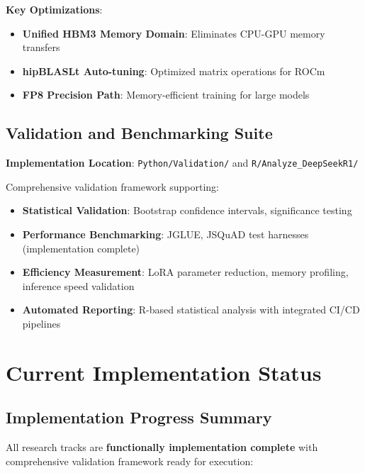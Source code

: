 \documentclass[12pt,a4paper]{article}
\begin{document}
\textbf{Key Optimizations}:

\begin{itemize}
\item \textbf{Unified HBM3 Memory Domain}: Eliminates CPU-GPU memory transfers
\item \textbf{hipBLASLt Auto-tuning}: Optimized matrix operations for ROCm
\item \textbf{FP8 Precision Path}: Memory-efficient training for large models
\end{itemize}

\subsection{Validation and Benchmarking Suite}

\textbf{Implementation Location}: \texttt{Python/Validation/} and \texttt{R/Analyze\_DeepSeekR1/}

Comprehensive validation framework supporting:

\begin{itemize}
\item \textbf{Statistical Validation}: Bootstrap confidence intervals, significance testing
\item \textbf{Performance Benchmarking}: JGLUE, JSQuAD test harnesses (implementation complete)
\item \textbf{Efficiency Measurement}: LoRA parameter reduction, memory profiling, inference speed validation
\item \textbf{Automated Reporting}: R-based statistical analysis with integrated CI/CD pipelines
\end{itemize}

\section{Current Implementation Status}

\subsection{Implementation Progress Summary}

All research tracks are \textbf{functionally implementation complete} with comprehensive validation framework ready for execution:
\end{document}
